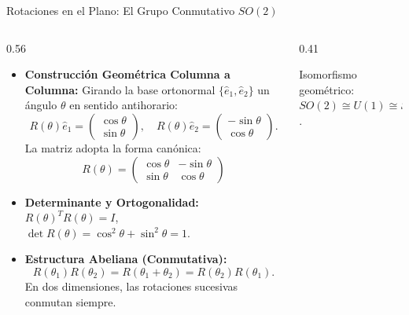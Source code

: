 \documentclass[10pt,aspectratio=169]{beamer}
\begin{document}
\begin{frame}{Rotaciones en el Plano: El Grupo Conmutativo $SO(2)$}
  \begin{columns}[c]
    \begin{column}{0.56\textwidth}
      \footnotesize
      \begin{itemize}\itemsep2pt
        \item \textbf{Construcción Geométrica Columna a Columna:}
        Girando la base ortonormal $\{\hat{e}_1, \hat{e}_2\}$ un ángulo $\theta$ en sentido antihorario:
        \[
        R(\theta)\hat{e}_1 = \begin{pmatrix} \cos\theta \\ \sin\theta \end{pmatrix}, \quad
        R(\theta)\hat{e}_2 = \begin{pmatrix} -\sin\theta \\ \cos\theta \end{pmatrix}.
        \]
        La matriz adopta la forma canónica:
        \[
        \boxed{R(\theta) = \begin{pmatrix} \cos\theta & -\sin\theta \\ \sin\theta & \cos\theta \end{pmatrix}}
        \]
        \item \textbf{Determinante y Ortogonalidad:}
        $R(\theta)^T R(\theta) = I$, $\det R(\theta) = \cos^2\theta + \sin^2\theta = 1$.
        \item \textbf{Estructura Abeliana (Conmutativa):}
        \[
        R(\theta_1) R(\theta_2) = R(\theta_1 + \theta_2) = R(\theta_2) R(\theta_1).
        \]
        En dos dimensiones, las rotaciones sucesivas conmutan siempre.
      \end{itemize}
    \end{column}
    \begin{column}{0.41\textwidth}
      \centering
      \vspace{0.1cm}
      {\scriptsize Isomorfismo geométrico: $SO(2) \cong U(1) \cong S^1$.}
    \end{column}
  \end{columns}
\end{frame}
\end{document}
